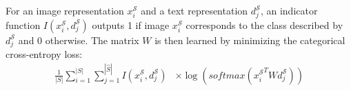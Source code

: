 \documentclass[11pt,a4paper]{article}
\newcommand\gal[1]{\textcolor{bright}{\textbf{GAL:} #1 }}
\newcommand\yuval[1]{\textcolor{darkpink}{\textbf{YUVAL:} #1 }}
\newcommand\tzuf[1]{\textcolor{blue}{\textbf{TZUF:} #1 }}
\begin{document}



For an image representation $x^{\mathcal{S}}_i$ and a text representation $d^{\mathcal{S}}_j$, an indicator function $I(x^{\mathcal{S}}_i,d^{\mathcal{S}}_j)$ outputs 1 if image $x^{\mathcal{S}}_i$ corresponds to the class described by $d^{\mathcal{S}}_j$ and 0 otherwise. 
The matrix $W$ is then learned by minimizing the categorical cross-entropy loss: 
\begin{equation}
\begin{split}
  \frac{1}{|S|}\sum_{i=1}^{|S|}\sum_{j=1}^{|\hat{S}|}I(x^{\mathcal{S}}_i,d^{\mathcal{S}}_j) 
  &\times\log(\textit{softmax}({x^{\mathcal{S}}_i}^TWd^{\mathcal{S}}_j))
\end{split}
\end{equation}



\end{document}
